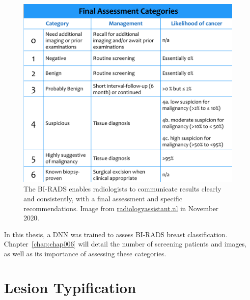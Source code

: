 
\begin{figure}[htbp]
\centering
\includegraphics[width=\columnwidth]{images/fig020}
\caption{The BI-RADS enables radiologists to communicate results clearly and consistently, with a final assessment and specific recommendations. Image from \protect\href{https://radiologyassistant.nl/breast/bi-rads/bi-rads-for-mammography-and-ultrasound-2013}{radiologyassistant.nl} in November 2020.}
\label{fig:fig020}
\end{figure}

In this thesis, a \ac{DNN} was trained to assess \ac{BI-RADS} breast classification.
Chapter~\ref{chap:chap006} will detail the number of screening patients and images, as well as its importance of assessing these categories.

\section{Lesion Typification}
\label{sec:chap002004}

